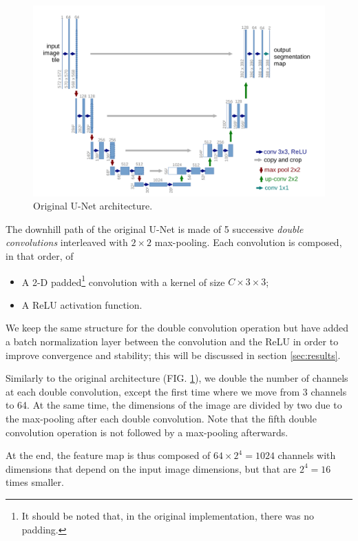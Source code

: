 \documentclass[twocolumn,superscriptaddress,aps,nofootinbib]{revtex4-1}
\begin{document}
\begin{figure}[h]
    \centering
    \includegraphics[width=\columnwidth]{resources/png/unet_architecture.png}
    \caption{Original U-Net architecture. \cite{ronneberger2015u}}
    \label{fig:unet_architecture}
\end{figure}

The downhill path of the original U-Net is made of 5 successive \emph{double convolutions} interleaved with $2 \times 2$ max-pooling. Each convolution is composed, in that order, of
\begin{itemize}[noitemsep]
    \item A 2-D padded\footnote{It should be noted that, in the original implementation, there was no padding.} convolution with a kernel of size $C \times 3 \times 3$;
    \item A ReLU activation function.
\end{itemize}
We keep the same structure for the double convolution operation but have added a batch normalization layer between the convolution and the ReLU in order to improve convergence and stability; this will be discussed in section \ref{sec:results}.

Similarly to the original architecture (FIG. \ref{fig:unet_architecture}), we double the number of channels at each double convolution, except the first time where we move from 3 channels to 64. At the same time, the dimensions of the image are divided by two due to the max-pooling after each double convolution. Note that the fifth double convolution operation is not followed by a max-pooling afterwards.

At the end, the feature map is thus composed of $64 \times 2^4 = 1024$ channels with dimensions that depend on the input image dimensions, but that are $2^4 = 16$ times smaller.
\end{document}
